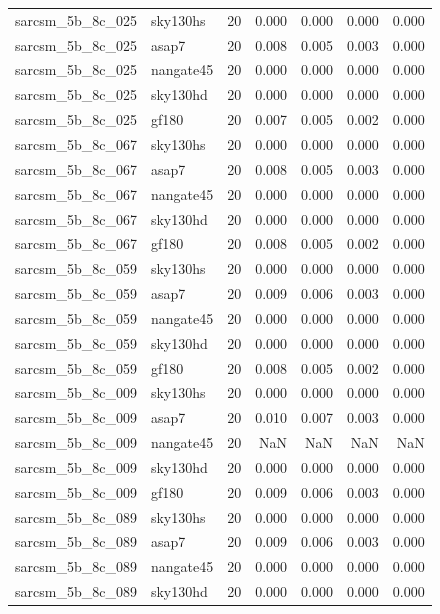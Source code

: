 \begin{tabular}{llrrrrr}
sarcsm\_5b\_8c\_025 & sky130hs & 20 & 0.000 & 0.000 & 0.000 & 0.000 \\
sarcsm\_5b\_8c\_025 & asap7 & 20 & 0.008 & 0.005 & 0.003 & 0.000 \\
sarcsm\_5b\_8c\_025 & nangate45 & 20 & 0.000 & 0.000 & 0.000 & 0.000 \\
sarcsm\_5b\_8c\_025 & sky130hd & 20 & 0.000 & 0.000 & 0.000 & 0.000 \\
sarcsm\_5b\_8c\_025 & gf180 & 20 & 0.007 & 0.005 & 0.002 & 0.000 \\
sarcsm\_5b\_8c\_067 & sky130hs & 20 & 0.000 & 0.000 & 0.000 & 0.000 \\
sarcsm\_5b\_8c\_067 & asap7 & 20 & 0.008 & 0.005 & 0.003 & 0.000 \\
sarcsm\_5b\_8c\_067 & nangate45 & 20 & 0.000 & 0.000 & 0.000 & 0.000 \\
sarcsm\_5b\_8c\_067 & sky130hd & 20 & 0.000 & 0.000 & 0.000 & 0.000 \\
sarcsm\_5b\_8c\_067 & gf180 & 20 & 0.008 & 0.005 & 0.002 & 0.000 \\
sarcsm\_5b\_8c\_059 & sky130hs & 20 & 0.000 & 0.000 & 0.000 & 0.000 \\
sarcsm\_5b\_8c\_059 & asap7 & 20 & 0.009 & 0.006 & 0.003 & 0.000 \\
sarcsm\_5b\_8c\_059 & nangate45 & 20 & 0.000 & 0.000 & 0.000 & 0.000 \\
sarcsm\_5b\_8c\_059 & sky130hd & 20 & 0.000 & 0.000 & 0.000 & 0.000 \\
sarcsm\_5b\_8c\_059 & gf180 & 20 & 0.008 & 0.005 & 0.002 & 0.000 \\
sarcsm\_5b\_8c\_009 & sky130hs & 20 & 0.000 & 0.000 & 0.000 & 0.000 \\
sarcsm\_5b\_8c\_009 & asap7 & 20 & 0.010 & 0.007 & 0.003 & 0.000 \\
sarcsm\_5b\_8c\_009 & nangate45 & 20 & NaN & NaN & NaN & NaN \\
sarcsm\_5b\_8c\_009 & sky130hd & 20 & 0.000 & 0.000 & 0.000 & 0.000 \\
sarcsm\_5b\_8c\_009 & gf180 & 20 & 0.009 & 0.006 & 0.003 & 0.000 \\
sarcsm\_5b\_8c\_089 & sky130hs & 20 & 0.000 & 0.000 & 0.000 & 0.000 \\
sarcsm\_5b\_8c\_089 & asap7 & 20 & 0.009 & 0.006 & 0.003 & 0.000 \\
sarcsm\_5b\_8c\_089 & nangate45 & 20 & 0.000 & 0.000 & 0.000 & 0.000 \\
sarcsm\_5b\_8c\_089 & sky130hd & 20 & 0.000 & 0.000 & 0.000 & 0.000 \\

\end{tabular}
